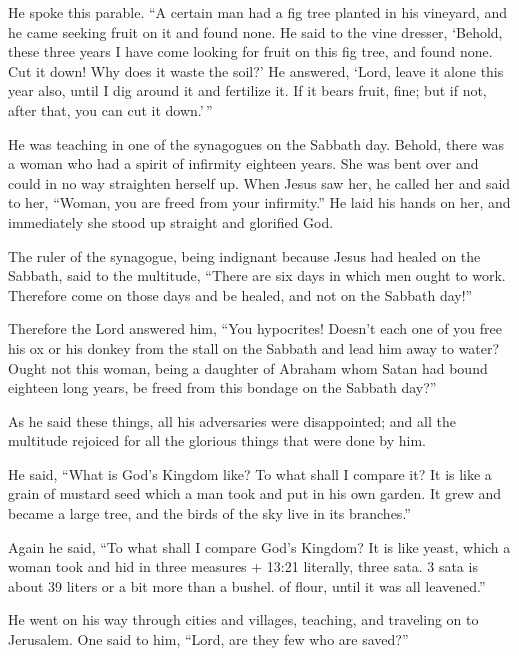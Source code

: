 He spoke this parable. ``A certain man had a fig tree
planted in his vineyard, and he came seeking fruit on it and found none.
 He said to the vine dresser, `Behold, these three years I
have come looking for fruit on this fig tree, and found none. Cut it
down! Why does it waste the soil?'  He answered, `Lord,
leave it alone this year also, until I dig around it and fertilize it.
 If it bears fruit, fine; but if not, after that, you can
cut it down.'\,''

 He was teaching in one of the synagogues on the Sabbath
day.  Behold, there was a woman who had a spirit of
infirmity eighteen years. She was bent over and could in no way
straighten herself up.  When Jesus saw her, he called her
and said to her, ``Woman, you are freed from your infirmity.''
 He laid his hands on her, and immediately she stood up
straight and glorified God.

 The ruler of the synagogue, being indignant because Jesus
had healed on the Sabbath, said to the multitude, ``There are six days
in which men ought to work. Therefore come on those days and be healed,
and not on the Sabbath day!''

 Therefore the Lord answered him, ``You hypocrites! Doesn't
each one of you free his ox or his donkey from the stall on the Sabbath
and lead him away to water?  Ought not this woman, being a
daughter of Abraham whom Satan had bound eighteen long years, be freed
from this bondage on the Sabbath day?''

 As he said these things, all his adversaries were
disappointed; and all the multitude rejoiced for all the glorious things
that were done by him.

 He said, ``What is God's Kingdom like? To what shall I
compare it?  It is like a grain of mustard seed which a man
took and put in his own garden. It grew and became a large tree, and the
birds of the sky live in its branches.''

 Again he said, ``To what shall I compare God's Kingdom?
 It is like yeast, which a woman took and hid in three
measures + 13:21 literally, three sata. 3 sata is about 39 liters or a
bit more than a bushel. of flour, until it was all leavened.''

 He went on his way through cities and villages, teaching,
and traveling on to Jerusalem.  One said to him, ``Lord,
are they few who are saved?''

